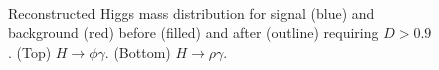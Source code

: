\begin{figure}[htb]
\begin{center}
\\
\end{center}
\caption{Reconstructed Higgs mass distribution for signal (blue) and background (red) before (filled) and after (outline) requiring $D > 0.9$. (Top) $H\rightarrow\phi\gamma$. (Bottom) $H\rightarrow\rho\gamma$.}
\label{fig:bdt-bkgsculpt2}
\end{figure}

